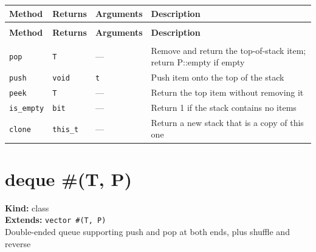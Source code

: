 \documentclass[11pt,letterpaper]{report}
\begin{document}
\begin{xltabular}{\linewidth}{>{\small}p{1.35in} >{\small}p{1.25in} >{\small}p{0.95in} >{\small}X}
\toprule
\textbf{Method} & \textbf{Returns} & \textbf{Arguments} & \textbf{Description} \\
\midrule
\endfirsthead
{} \\
\midrule
\textbf{Method} & \textbf{Returns} & \textbf{Arguments} & \textbf{Description} \\
\midrule
\endhead
\midrule
{} \\
\endfoot
\bottomrule
\endlastfoot
\texttt{pop} & \texttt{T} & --- & Remove and return the top-of-stack item; return P::empty if empty \\
\texttt{push} & \texttt{void} & \texttt{t} & Push item onto the top of the stack \\
\texttt{peek} & \texttt{T} & --- & Return the top item without removing it \\
\texttt{is\_empty} & \texttt{bit} & --- & Return 1 if the stack contains no items \\
\texttt{clone} & \texttt{this\_t} & --- & Return a new stack that is a copy of this one \\
\end{xltabular}

\section{deque \#(T, P)}
\label{cls:dequeTP}

\noindent\textbf{Kind:} class\\
\noindent\textbf{Extends:} \texttt{vector \#(T, P)}\\
\noindent Double-ended queue supporting push and pop at both ends, plus shuffle and reverse
\end{document}
